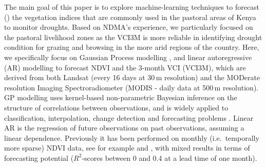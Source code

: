 \documentclass[review]{elsarticle}
\begin{document}

The main goal of this paper is to explore machine-learning techniques to forecast () the vegetation indices that are commonly used in the pastoral areas of Kenya to monitor droughts. Based on NDMA's experience, we particularly focused on the pastoral livelihood zones as the VCI3M is more reliable in identifying drought condition for grazing and browsing in the more arid regions of the country.   Here, we specifically focus on Gaussian Process modelling \cite[GP,][]{gpm}, and linear autoregressive (AR) modelling \citep[e.g.][]{Hamilton94} to forecast NDVI and the 3-month VCI (VCI3M), which are derived from both Landsat (every 16 days at 30\,m resolution) and the MODerate resolution Imaging Spectroradiometer (MODIS - daily data at 500\,m resolution). GP modelling uses kernel-based non-parametric Bayesian inference on the structure of correlations between observations, and is widely applied to classification, interpolation, change detection and forecasting problems \citep{955315,Chandola2010SCALABLETS,7487896,rs11050481}. %
Linear AR is the regression of future observations on past observations, assuming a linear dependence. Previously it has been performed on monthly (i.e.~temporally more sparse) NDVI data, see for example \cite{Asoka:2015} and \cite{Papagiannopoulou}, with mixed results in terms of forecasting potential ($R^2$-scores between 0 and 0.4 at a lead time of one month). 
\end{document}
